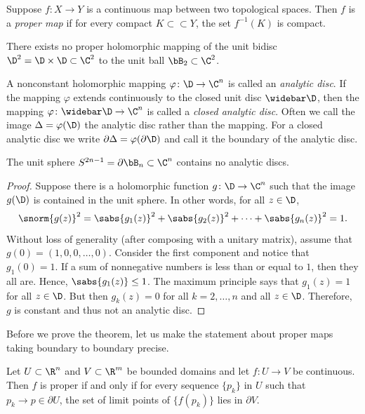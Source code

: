 \begin{definition}
Suppose $f\colon X\to Y$ is a continuous map between two topological spaces. Then $f$ is a \emph{proper map} if for every compact $K\subset\subset Y$, the set $f^{-1}(K)$ is compact.
\end{definition}
\begin{theorem}[Rothstein 1935]\label{thm:Rothstein}
There exists no proper holomorphic mapping of the unit bidisc $\D^2=\D\times\D\subset\C^2$ to the unit ball $\bB_2\subset\C^2$.
\end{theorem}
\begin{definition}
A nonconstant holomorphic mapping $\varphi\colon\D\to\C^n$ is called an \emph{analytic disc}. If the mapping $\varphi$ extends continuously to the closed unit disc $\widebar\D$, then the mapping $\varphi\colon\widebar\D\to\C^n$ is called a \emph{closed analytic disc}.
Often we call the image $\Delta=\varphi(\D)$ the analytic disc rather than the mapping. For a closed analytic disc we write $\partial\Delta=\varphi(\partial\D)$ and call it the boundary of the analytic disc.
\end{definition}
\begin{proposition}\label{prop:noanaldiscinsphere}
The unit sphere $S^{2n-1}=\partial\bB_n\subset\C^n$ contains no analytic discs.
\end{proposition}
\begin{proof}
Suppose there is a holomorphic function $g\colon\D\to\C^n$ such that the image $g(\D)$ is contained in the unit sphere. In other words, for all $z\in\D$,
\[\snorm{g(z)}^2=\sabs{g_1(z)}^2+\sabs{g_2(z)}^2+\cdots+\sabs{g_n(z)}^2=1.\]
Without loss of generality (after composing with a unitary matrix), assume that $g(0)=(1,0,0,\ldots,0)$. Consider the first component and notice that $g_1(0)=1$. If a sum of nonnegative numbers is less than or equal to $1$, then they all are. Hence, $\sabs{g_1(z)}\leq1$. The maximum principle says that $g_1(z)=1$ for all $z\in\D$. But then $g_k(z)=0$ for all $k=2,\ldots,n$ and all $z\in\D$. Therefore, $g$ is constant and thus not an analytic disc.
\end{proof}
Before we prove the theorem, let us make the statement about proper maps taking boundary to boundary precise.
\begin{lemma}\label{lemma:bndrytobndry}
Let $U\subset\R^n$ and $V\subset\R^m$ be bounded domains and let $f\colon U\to V$ be continuous. Then $f$ is proper if and only if for every sequence $\{p_k\}$ in $U$ such that $p_k\to p\in\partial U$, the set of limit points of $\bigl\{f(p_k)\bigr\}$ lies in $\partial V$.
\end{lemma}

